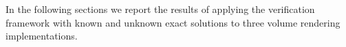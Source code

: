 
In the following sections we report the results of applying the
verification framework with known and unknown exact solutions to three
volume rendering implementations. 


